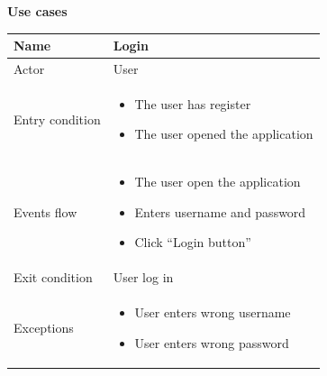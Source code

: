 \addvspace{1cm} 
{\normalsize \textbf{Use cases}}
\par \medskip

\begin{tabular}{|p{5cm} | p{7cm} | }
\hline
Name & Login \\
\hline
Actor & User \\
\hline
Entry condition &
\begin{itemize}
\item The user has register
\item The user opened the application
\end{itemize} \\
\hline
Events flow & 
\begin{itemize}
	\item The user open the application
	\item Enters username and password
	\item Click “Login button”
\end{itemize} \\
\hline
Exit condition & User log in \\
\hline 
Exceptions &
\begin{itemize}
	\item User enters wrong username
	\item User enters wrong password
\end{itemize} \\
\hline
\end{tabular}

\par \medskip

